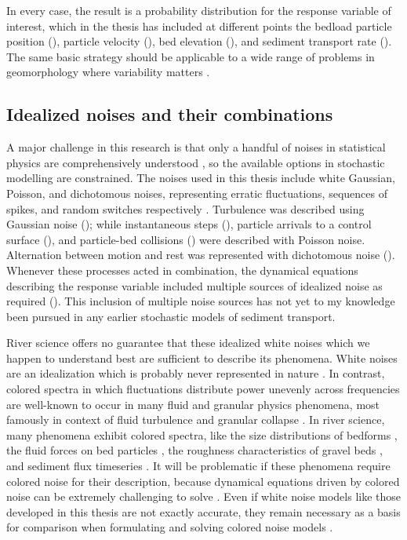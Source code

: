 In every case, the result is a probability distribution for the response variable of interest, which in the thesis has included at different points the bedload particle position (), particle velocity (), bed elevation (), and sediment transport rate ().
The same basic strategy should be applicable to a wide range of problems in geomorphology where variability matters \citep{Furbish2021a}.

\subsection{Idealized noises and their combinations}

A major challenge in this research is that only a handful of noises in statistical physics are comprehensively understood \citep{Horsthemke1984}, so the available options in stochastic modelling are constrained.
The noises used in this thesis include white Gaussian, Poisson, and dichotomous noises, representing erratic fluctuations, sequences of spikes, and random switches respectively \citep{VanDenBroeck1983}.
Turbulence was described using Gaussian noise (); while instantaneous steps (), particle arrivals to a control surface (), and particle-bed collisions () were described with Poisson noise. Alternation between motion and rest was represented with dichotomous noise ().
Whenever these processes acted in combination, the dynamical equations describing the response variable included multiple sources of idealized noise as required ().
This inclusion of multiple noise sources has not yet to my knowledge been pursued in any earlier stochastic models of sediment transport.

River science offers no guarantee that these idealized white noises which we happen to understand best are sufficient to describe its phenomena.
White noises are an idealization which is probably never represented in nature \citep{Gardiner1983,Kubo1972}.
In contrast, colored spectra in which fluctuations distribute power unevenly across frequencies are well-known to occur in many fluid and granular physics phenomena, most famously in context of fluid turbulence \citep{Kolmogorov1941,Nikora2000} and granular collapse \citep{Bak1987,Jensen1998}.
In river science, many phenomena exhibit colored spectra, like the size distributions of bedforms \citep{Nikora1997,Guala2014}, the fluid forces on bed particles \citep{Dwivedi2011, Amir2014}, the roughness characteristics of gravel beds \citep{Aberle2006,Singh2012}, and sediment flux timeseries \citep{Dhont2018,Chartrand2021}.
It will be problematic if these phenomena require colored noise for their description, because dynamical equations driven by colored noise can be extremely challenging to solve \citep{Hanggi1978,Luczka2005,Hanggi2007}. Even if white noise models like those developed in this thesis are not exactly accurate, they remain necessary as a basis for comparison when formulating and solving colored noise models \citep{Fox1986,Moss1989}.

